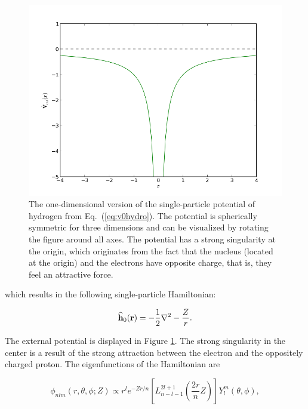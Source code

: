 \begin{figure}
 \begin{center}
  \includegraphics[scale=0.5]{../Graphics/Potentials/hydrogen.png}
  \caption{The one-dimensional version of the single-particle potential of hydrogen from Eq.~(\ref{eq:v0hydro}). The potential is spherically symmetric for three dimensions and can be visualized by rotating the figure around all axes. The potential has a strong singularity at the origin, which originates from the fact that the nucleus (located at the origin) and the electrons have opposite charge, that is, they feel an attractive force.}
  \label{fig:extPotHydrogen}
 \end{center}
\end{figure}

which results in the following single-particle Hamiltonian:

\begin{equation}
 {\bf\widehat{h}}_0(\mathbf{r}) = -\frac{1}{2}\nabla^2 - \frac{Z}{r}.
\end{equation}

The external potential is displayed in Figure \ref{fig:extPotHydrogen}. The strong singularity in the center is a result of the strong attraction between the electron and the oppositely charged proton. The eigenfunctions of the Hamiltonian are \cite{griffiths}

\begin{equation}
 \phi_{nlm}(r, \theta, \phi; Z) \propto r^l e^{-Zr/n}\left[L_{n-l-1}^{2l+1}\left(\frac{2r}{n}Z\right)\right] Y_l^m(\theta, \phi), \label{eq:hydrogenBasisComplex}
\end{equation}

